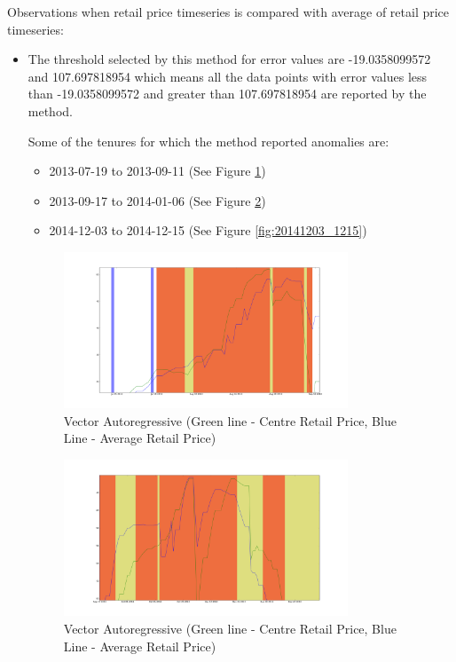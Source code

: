 		Observations when retail price timeseries is compared with average of retail price timeseries: 
		
		\begin{itemize}
			\item The threshold selected by this method for error values are -19.0358099572 and 107.697818954 which means all the data points with error values less than -19.0358099572 and greater than 107.697818954 are reported by the method.
			
			Some of the tenures for which the method reported anomalies are:
			
			\begin{itemize}
				\item 2013-07-19 to 2013-09-11 (See Figure \ref{fig:20130719_0911})
				\item 2013-09-17 to 2014-01-06 (See Figure \ref{fig:20130917_0106})
				\item 2014-12-03 to 2014-12-15 (See Figure \ref{fig:20141203_1215})
			\end{itemize}
			\begin{figure}[H]
		    	\centering
  		    	\includegraphics[width=0.8\textwidth]{graphs/20130719_0911.png}
		    	\caption{Vector Autoregressive (Green line - Centre Retail Price, Blue Line - Average Retail Price)}
		    	\label{fig:20130719_0911}
			\end{figure}
			
			\begin{figure}[H]
		    	\centering
  		    	\includegraphics[width=0.8\textwidth]{graphs/20130917_0106.png}
		    	\caption{Vector Autoregressive (Green line - Centre Retail Price, Blue Line - Average Retail Price)}
		    	\label{fig:20130917_0106}
			\end{figure}


\end{itemize}
